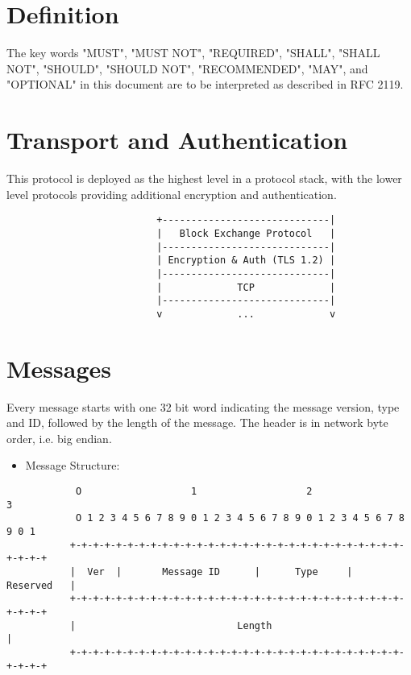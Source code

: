 \section{Definition}

The key words "MUST", "MUST NOT", "REQUIRED", "SHALL", "SHALL NOT",
"SHOULD", "SHOULD NOT", "RECOMMENDED", "MAY", and "OPTIONAL" in this
document are to be interpreted as described in RFC 2119.


\section{Transport and Authentication}

This protocol is deployed as the highest level in a protocol stack, with
the lower level protocols providing additional encryption and authentication.

\begin{verbatim}
                          +-----------------------------|
                          |   Block Exchange Protocol   |
                          |-----------------------------|
                          | Encryption & Auth (TLS 1.2) |
                          |-----------------------------|
                          |             TCP             |
                          |-----------------------------|
                          v             ...             v
\end{verbatim}

\section{Messages}

Every message starts with one 32 bit word indicating the message version,
type and ID, followed by the length of the message. The header is in
network byte order, i.e. big endian.

\begin{itemize}
 \item Message Structure:
\end{itemize}

\begin{verbatim}
            O                   1                   2                   3
            O 1 2 3 4 5 6 7 8 9 0 1 2 3 4 5 6 7 8 9 0 1 2 3 4 5 6 7 8 9 0 1
           +-+-+-+-+-+-+-+-+-+-+-+-+-+-+-+-+-+-+-+-+-+-+-+-+-+-+-+-+-+-+-+-+
           |  Ver  |       Message ID      |      Type     |    Reserved   |
           +-+-+-+-+-+-+-+-+-+-+-+-+-+-+-+-+-+-+-+-+-+-+-+-+-+-+-+-+-+-+-+-+
           |                            Length                             |
           +-+-+-+-+-+-+-+-+-+-+-+-+-+-+-+-+-+-+-+-+-+-+-+-+-+-+-+-+-+-+-+-+
\end{verbatim}

